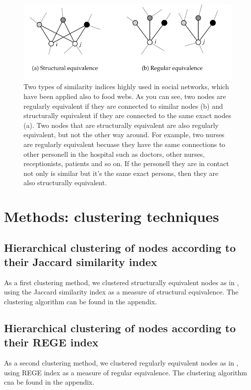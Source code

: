 \documentclass[twocolumn]{article}
\begin{document}
	\begin{figure}[htbp]%
		\centering
		\includegraphics[width=.8\linewidth]{reg_struct_equivalence}
		\caption{Two types of similarity indices highly used in social networks, which have been applied also to food webs. As you can see, two nodes are regularly equivalent if they are connected to similar nodes (b) and structurally equivalent if they are connected to the same exact nodes (a). Two nodes that are structurally equivalent are also regularly equivalent, but not the other way around. For example, two nurses are regularly equivalent becuase they have the same connections to other personell in the hospital such as doctors, other nurses, receptionists, patients and so on. If the personell they are in contact not only is similar but it's the same exact persons, then they are also structurally equivalent.}
		\label{fig:equivalences}
	\end{figure}
\section*{Methods: clustering techniques}
	\subsection*{Hierarchical clustering of nodes according to their Jaccard similarity index}
	As a first clustering method, we clustered structurally equivalent nodes as in \citet{Yodzis1999}, using the Jaccard similarity index as a measure of structural equivalence. The clustering algorithm can be found in the appendix.
	\subsection*{Hierarchical clustering of nodes according to their REGE index}
	As a second clustering method, we clustered regularly equivalent nodes as in \citet{Luczkovich2003}, using REGE index as a measure of regular equivalence. The clustering algorithm cna be found in the appendix.
\end{document}
